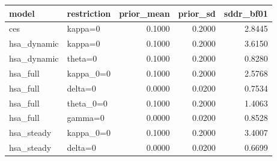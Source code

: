 \begin{tabular}{llrrr}
\toprule
model & restriction & prior\_mean & prior\_sd & sddr\_bf01 \\
\midrule
ces & kappa=0 & 0.1000 & 0.2000 & 2.8445 \\
hsa\_dynamic & kappa=0 & 0.1000 & 0.2000 & 3.6150 \\
hsa\_dynamic & theta=0 & 0.1000 & 0.2000 & 0.8280 \\
hsa\_full & kappa\_0=0 & 0.1000 & 0.2000 & 2.5768 \\
hsa\_full & delta=0 & 0.0000 & 0.0200 & 0.7534 \\
hsa\_full & theta\_0=0 & 0.1000 & 0.2000 & 1.4063 \\
hsa\_full & gamma=0 & 0.0000 & 0.0200 & 0.8528 \\
hsa\_steady & kappa\_0=0 & 0.1000 & 0.2000 & 3.4007 \\
hsa\_steady & delta=0 & 0.0000 & 0.0200 & 0.6699 \\
\bottomrule
\end{tabular}
